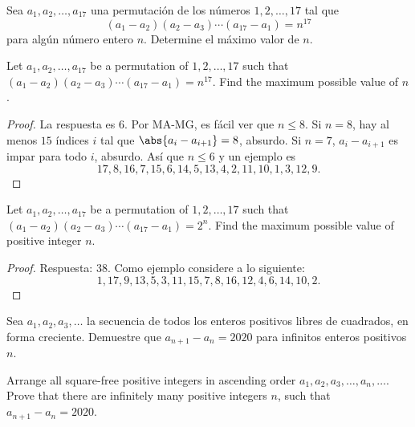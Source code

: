 
\begin{probMG}[CSMO 2020/10.4]
  Sea $a_1,a_2,\dots,a_{17}$ una permutación de los números $1,2,\dots,17$ tal
  que
  \[(a_1-a_2)(a_2-a_3)\cdots(a_{17}-a_1)=n^{17}\]
  para algún número entero $n$. Determine el máximo valor de $n$.
  \begin{hint}
    Let $a_1,a_2,\dots,a_{17}$ be a permutation of $1,2,\dots,17$ such that
    $(a_1-a_2)(a_2-a_3)\cdots(a_{17}-a_1)=n^{17}$. Find the maximum possible
    value of $n$.
  \end{hint}
\end{probMG}

\begin{proof}
  La respuesta es $6$. Por MA-MG, es fácil ver que $n\le 8$. Si $n=8$, hay al
  menos $15$ índices $i$ tal que $\abs{a_i-a_{i+1}}=8$, absurdo. Si $n=7$,
  $a_i-a_{i+1}$ es impar para todo $i$, absurdo. Así que $n\le 6$ y un ejemplo
  es
  \[17,8,16,7,15,6,14,5,13,4,2,11,10,1,3,12,9.\]
\end{proof}

\begin{probEG}[CSMO 2020/11.1]
  Let $a_1,a_2,\dots,a_{17}$ be a permutation of $1,2,\dots,17$ such that
  $(a_1-a_2)(a_2-a_3)\cdots(a_{17}-a_1)=2^n$. Find the maximum possible value of
  positive integer $n$.
\end{probEG}

\begin{proof}
  Respuesta: $38$. Como ejemplo considere a lo siguiente:
  \[1,17,9,13,5,3,11,15,7,8,16,12,4,6,14,10,2.\]
\end{proof}

\begin{probMR}[CSMO 2020/11.7]
  Sea $a_1,a_2,a_3,\dots$ la secuencia de todos los enteros positivos libres de
  cuadrados, en forma creciente. Demuestre que $a_{n+1}-a_n=2020$ para infinitos
  enteros positivos $n$.
  \begin{hint}
    Arrange all square-free positive integers in ascending order
    $a_1,a_2,a_3,\dots,a_n,\dots$. Prove that there are infinitely many positive
    integers $n$, such that $a_{n+1}-a_n=2020$.
  \end{hint}
\end{probMR}

